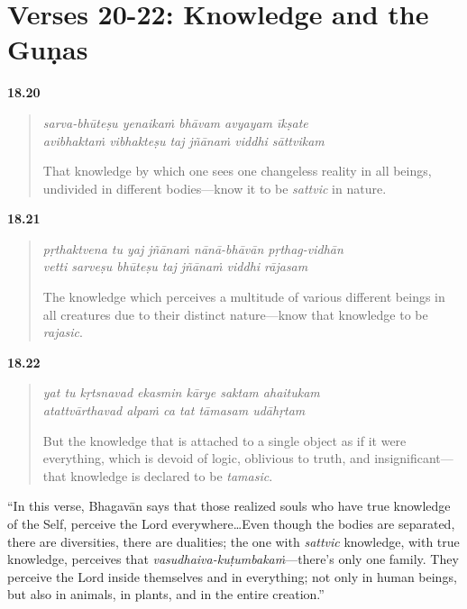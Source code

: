 \section{Verses 20-22: Knowledge and the Guṇas}\label{sec-verses-20-22-knowledge-and-the-gunas}


\par\noindent\textbf{18.20}\par
\begin{verse}
\textit{sarva-bhūteṣu yenaikaṁ bhāvam avyayam īkṣate} \\
\textit{avibhaktaṁ vibhakteṣu taj jñānaṁ viddhi sāttvikam}

\noindent That knowledge by which one sees one changeless reality in all beings, undivided in different bodies---know it to be \textit{sattvic} in nature.
\end{verse}
\par



\par\noindent\textbf{18.21}\par
\begin{verse}
\textit{pṛthaktvena tu yaj jñānaṁ nānā-bhāvān pṛthag-vidhān} \\
\textit{vetti sarveṣu bhūteṣu taj jñānaṁ viddhi rājasam}

\noindent The knowledge which perceives a multitude of various different beings in all creatures due to their distinct nature---know that knowledge to be \textit{rajasic}.
\end{verse}
\par



\par\noindent\textbf{18.22}\par
\begin{verse}
\textit{yat tu kṛtsnavad ekasmin kārye saktam ahaitukam} \\
\textit{atattvārthavad alpaṁ ca tat tāmasam udāhṛtam}

\noindent But the knowledge that is attached to a single object as if it were everything, which is devoid of logic, oblivious to truth, and insignificant---that knowledge is declared to be \textit{tamasic}.
\end{verse}
\par


\enquote{In this verse, Bhagavān says that those realized souls who have true knowledge of the Self, perceive the Lord everywhere\ldots Even though the bodies are separated, there are diversities, there are dualities; the one with \textit{sattvic} knowledge, with true knowledge, perceives that \textit{vasudhaiva-kuṭumbakaṁ}---there’s only one family. They perceive the Lord inside themselves and in everything; not only in human beings, but also in animals, in plants, and in the entire creation.}

